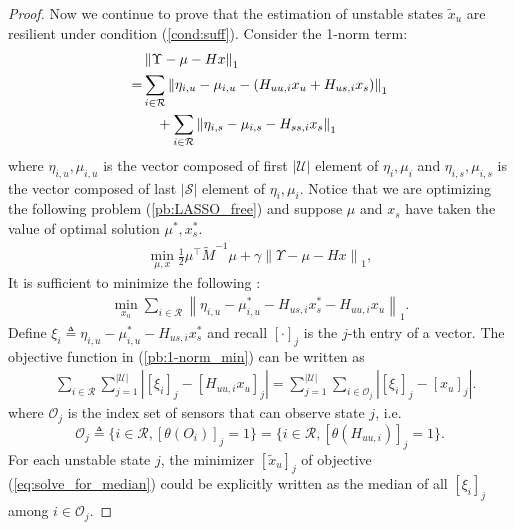 \documentclass[journal]{IEEEtran}
\newcommand{\Rc}{{\mathcal{R}}}
\newcommand{\Uc}{{\mathcal{U}}}
\newcommand{\Sc}{{\mathcal{S}}}
\newcommand{\Oc}{{\mathcal{O}}}
\newtheorem*{proof}{\textbf{Proof}}
\begin{document}
\begin{proof}
		Now we continue to prove that the estimation of unstable states $\tilde{x}_u$ are resilient under condition (\ref{cond:suff}).
		Consider the 1-norm term:
		\begin{align*}
			&\left\| \Upsilon-\mu-H x \right\|_1 \\
			=&\sum_{i\in\Rc} 
			\left\|\eta_{i,u}-\mu_{i,u}-(H_{uu,i} x_u + H_{us,i} x_s) \right\|_1 \notag \\
			&\quad + \sum_{i\in\Rc} \left\|\eta_{i,s}-\mu_{i,s}- H_{ss,i} x_s \right\|_1 
		\end{align*}
		where $\eta_{i,u}, \mu_{i,u}$ is the vector composed of first $|\Uc|$ element of $\eta_{i}, \mu_{i}$ and 
		$\eta_{i,s}, \mu_{i,s}$ is the vector composed of last $|\Sc|$ element of $\eta_{i}, \mu_{i}$.
		Notice that we are optimizing the following problem (\ref{pb:LASSO_free}) and suppose $\mu$ and $x_s$ have taken the value of optimal solution $\mu^*, x_s^*$.
		\begin{align}\label{pb:LASSO_free}
			\min _{\mu,x} \frac{1}{2} \mu^{\top} \tilde{M}^{-1} \mu+\gamma\left\|\Upsilon-\mu-H x\right\|_1 ,
		\end{align}
		It is sufficient to minimize the following :
		\begin{align}\label{pb:1-norm_min}
			\min_{x_u} \sum_{i\in\Rc} \left\|\eta_{i,u}-\mu^*_{i,u}- H_{us,i} x^*_s - H_{uu,i} x_u \right\|_1  .
		\end{align}
		Define $\xi_i\triangleq \eta_{i,u}-\mu^*_{i,u}- H_{us,i} x^*_s $ and recall $[\cdot]_j$ is the $j$-th entry of a vector. The objective function in (\ref{pb:1-norm_min}) can be written as 
		\begin{align}
			&\sum_{i\in\Rc}\sum_{j=1}^{|\Uc|} \left| [\xi_i]_j -[H_{uu,i} x_u]_j \right| 
			=\sum_{j=1}^{|\Uc|}\sum_{i\in\Oc_j} \left| [\xi_i]_j -[x_u]_j \right| . \label{eq:solve_for_median}
		\end{align}
		where $\Oc_j$ is the index set of sensors that can observe state $j$, i.e.
		\begin{equation*}
			\Oc_j\triangleq \{i\in\Rc, [\theta(O_i)]_j = 1\}=\{i\in\Rc, [\theta(H_{uu,i})]_j = 1\}.
		\end{equation*}
		For each unstable state $j$, the minimizer $[\tilde{x}_u]_j$ of objective (\ref{eq:solve_for_median}) could be explicitly written as the median of all $[\xi_i]_j$ among $i\in\Oc_j$.
		

\end{proof}
\end{document}
